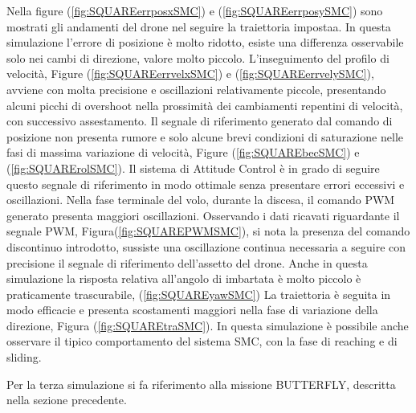 Nella figure (\ref{fig:SQUAREerrposxSMC}) e (\ref{fig:SQUAREerrposySMC}) sono mostrati gli andamenti del drone nel seguire la traiettoria impostaa. In questa simulazione l'errore di posizione è molto ridotto, esiste una differenza osservabile solo nei cambi di direzione, valore molto piccolo. L'inseguimento del profilo di velocità, Figure (\ref{fig:SQUAREerrvelxSMC}) e (\ref{fig:SQUAREerrvelySMC}), avviene con molta precisione e oscillazioni relativamente piccole, presentando alcuni picchi di overshoot nella prossimità dei cambiamenti repentini di velocità, con successivo assestamento. Il segnale di riferimento generato dal comando di posizione non presenta rumore e solo alcune brevi condizioni di saturazione nelle fasi di massima variazione di velocità, Figure (\ref{fig:SQUAREbecSMC}) e (\ref{fig:SQUARErolSMC}). Il sistema di Attitude Control è in grado di seguire questo segnale di riferimento in modo ottimale senza presentare errori eccessivi e oscillazioni. Nella fase terminale del volo, durante la discesa, il comando PWM generato presenta maggiori oscillazioni. Osservando i dati ricavati riguardante il segnale PWM, Figura(\ref{fig:SQUAREPWMSMC}), si nota la presenza del comando discontinuo introdotto, sussiste una oscillazione continua necessaria a seguire con precisione il segnale di riferimento dell'assetto del drone. Anche in questa simulazione la risposta relativa all'angolo di imbartata è molto piccolo è praticamente trascurabile, (\ref{fig:SQUAREyawSMC}) La traiettoria è seguita in modo efficacie e presenta scostamenti maggiori nella fase di variazione della direzione, Figura (\ref{fig:SQUAREtraSMC}). In questa simulazione è possibile anche osservare il tipico comportamento del sistema SMC, con la fase di reaching e di sliding.

Per la terza simulazione si fa riferimento alla missione BUTTERFLY, descritta nella sezione precedente.

